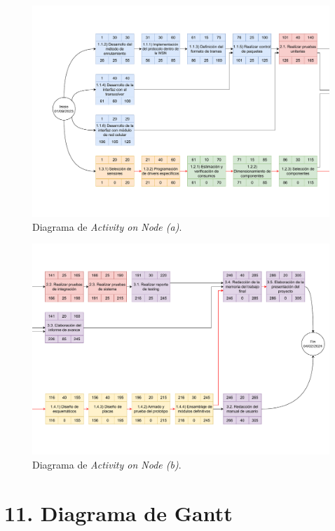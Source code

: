 \documentclass[
11pt, %
codirector, %
]{charter}
\begin{document}
\begin{landscape}
\begin{figure}[htpb]
\centering 
\includegraphics[height=0.85\textheight]{./Figuras/AoN-1.pdf}
\caption{Diagrama de \textit{Activity on Node (a)}.}
\label{fig:AoN-1}
\end{figure}
\end{landscape}

\begin{landscape}
\begin{figure}[htpb]
\centering 
\includegraphics[height=0.85\textheight]{./Figuras/AoN-2.pdf}
\caption{Diagrama de \textit{Activity on Node (b)}.}
\label{fig:AoN-2}
\end{figure}
\end{landscape}


\section{11. Diagrama de Gantt}
\label{sec:gantt}
\end{document}

